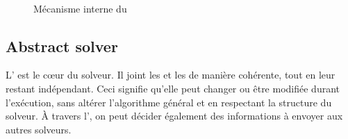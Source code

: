 \begin{figure}
	\centering
	\\%
	\caption[]{Mécanisme interne du \opch}
	\label{fig:ochperform}
\end{figure}%

\subsection{Abstract solver}

L'\as{}  est le c\oe{}ur du solveur. Il joint les \oms{} et les \opchs{} de  manière cohérente, tout en leur restant  indépendant. Ceci signifie  qu'elle peut  changer ou  être modifiée  durant l'exécution, sans altérer  l'algorithme général  et en  respectant la  structure du solveur.  À  travers  l'\as, on peut décider également des informations à envoyer aux autres solveurs. 

